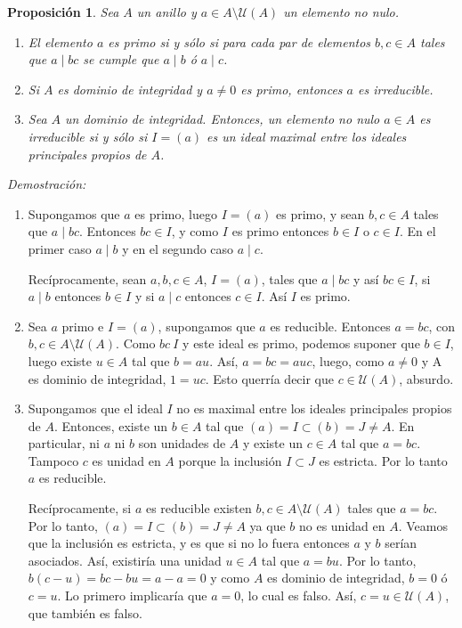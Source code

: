 \documentclass[12pt]{article}
\newtheorem{proposition}[theorem]{Proposición}
\begin{document}
\begin{proposition}\label{eq:eirr} Sea $A$ un anillo y $a \in A \setminus \mathcal{U}(A)$ un elemento no nulo. 
\begin{enumerate}
\item El elemento $a$ es primo si y sólo si para cada par de elementos $b, c \in A$ tales que $a \mid bc$ se cumple que $a \mid b$ ó $a\mid c$.
\item Si $A$ es dominio de integridad y $a \neq 0$ es primo, entonces $a$ es irreducible.
\item Sea $A$ un dominio de integridad. Entonces, un elemento no nulo $a \in A$ es irreducible si y sólo si $I=(a)$ es un ideal maximal entre los ideales principales propios de $A$.
\end{enumerate}
\end{proposition}
\emph{Demostración: }\begin{enumerate}
\item Supongamos que $a$ es primo, luego $I=(a)$ es primo, y sean $b,c \in A$ tales que $a \mid bc$. Entonces $bc \in I$, y como $I$ es primo entonces $b \in I$ o $c \in I$. En el primer caso $a \mid b$ y en el segundo caso $a \mid c$.

Recíprocamente, sean $a,b,c \in A$, $I = (a)$, tales que $a \mid bc$ y así $bc \in I$, si $a \mid b$ entonces $b \in I$ y si $a \mid c$ entonces $c \in I$. Así $I$ es primo.
\item Sea $a$ primo e $I=(a)$, supongamos que $a$ es reducible. Entonces $a = bc$, con $b,c \in A \setminus \mathcal{U}(A)$. Como $bc \ I$ y este ideal es primo, podemos suponer que $b \in I$, luego existe $u \in A$ tal que $b = au$. Así, $a = bc = auc$, luego, como $a \neq 0$ y A es dominio de integridad, $1 = uc$. Esto querría decir que $c \in \mathcal{U}(A)$, absurdo.
\item Supongamos que el ideal $I$ no es maximal entre los ideales principales propios de $A$. Entonces, existe un $b \in A$ tal que $(a) = I \subset (b) = J \neq A$. En particular, ni $a$ ni $b$ son unidades de $A$ y existe un $c \in A$ tal que $a = bc$. Tampoco $c$ es unidad en $A$ porque la inclusión $I \subset J$ es estricta. Por lo tanto $a$ es reducible.

Recíprocamente, si $a$ es reducible existen $b, c \in A \setminus \mathcal{U}(A)$ tales que $a = bc$. Por lo tanto, $(a) = I \subset (b) = J \neq A$ ya que $b$ no es unidad en $A$. Veamos que la inclusión es estricta, y es que si no lo fuera entonces $a$ y $b$ serían asociados. Así, existiría una unidad $u \in A$ tal que $a = bu$. Por lo tanto, $b(c-u) = bc-bu = a-a = 0$ y como $A$ es dominio de integridad, $b = 0$ ó $c = u$. Lo primero implicaría que $a = 0$, lo cual es falso. Así, $c = u \in \mathcal{U}(A)$, que también es falso.
\end{enumerate}
\end{document}
